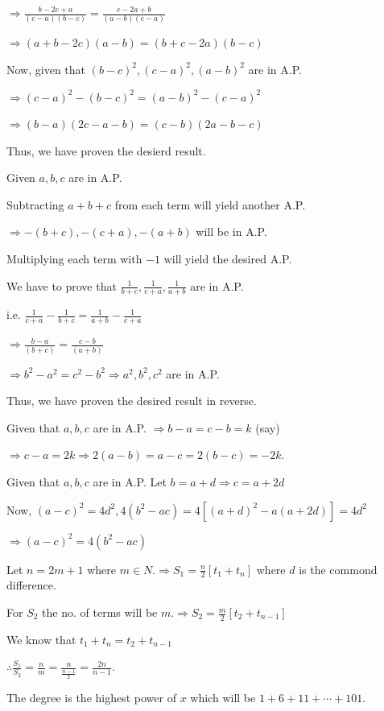   $\Rightarrow \frac{b -2c + a}{(c - a)(b - c)} = \frac{c - 2a + b}{(a - b)(c - a)}$

  $\Rightarrow (a + b - 2c)(a - b) = (b + c - 2a)(b - c)$

  Now, given that $(b - c)^2, (c - a)^2, (a - b)^2$ are in A.P.

  $\Rightarrow (c - a)^2 - (b - c)^2 = (a - b)^2 - (c - a)^2$

  $\Rightarrow (b - a)(2c - a - b) = (c - b)(2a - b - c)$

  Thus, we have proven the desierd result.
\item Given $a, b, c$ are in A.P.

  Subtracting $a + b + c$ from each term will yield another A.P.

  $\Rightarrow -(b + c), -(c + a), -(a + b)$ will be in A.P.

  Multiplying each term with $-1$ will yield the desired A.P.
\item We have to prove that $\frac{1}{b + c}, \frac{1}{c + a}, \frac{1}{a + b}$ are in A.P.

  i.e. $\frac{1}{c + a} - \frac{1}{b + c} = \frac{1}{a + b} - \frac{1}{c + a}$

  $\Rightarrow \frac{b - a}{(b + c)} = \frac{c - b}{(a + b)}$

  $\Rightarrow b^2 - a^2 = c^2 - b^2 \Rightarrow a^2, b^2, c^2$ are in A.P.

  Thus, we have proven the desired result in reverse.
\item Given that $a, b, c$ are in A.P. $\Rightarrow b - a = c - b = k$ (say)

  $\Rightarrow c - a = 2k \Rightarrow 2(a - b) = a - c = 2(b - c) = -2k$.
\item Given that $a, b, c$ are in A.P. Let $b = a + d \Rightarrow c = a + 2d$

  Now, $(a - c)^2 = 4d^2, 4(b^2 - ac) = 4[(a + d)^2 - a(a + 2d)] = 4d^2$

  $\Rightarrow (a - c)^2 = 4(b^2 - ac)$
\item Let $n = 2m + 1$ where $m\in N. \Rightarrow S_1 = \frac{n}{2}[t_1 + t_n]$ where $d$ is the commond difference.

  For $S_2$ the no. of terms will be $m. \Rightarrow S_2 = \frac{m}{2}[t_2 + t_{n - 1}]$

  We know that $t_1 + t_n = t_2 + t_{n - 1}$

  $\therefore \frac{S_1}{S_2} = \frac{n}{m} = \frac{n}{\tfrac{n - 1}{2}} = \frac{2n}{n - 1}$.
\item The degree is the highest power of $x$ which will be $1 + 6 + 11 + \cdots + 101$.

